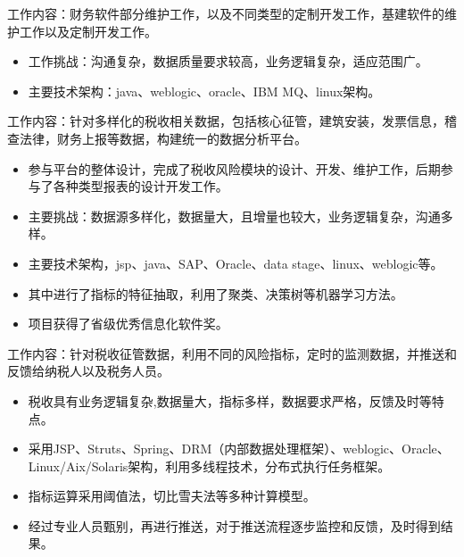 \documentclass{resume}
\begin{document}
\begin{onehalfspacing}
工作内容：财务软件部分维护工作，以及不同类型的定制开发工作，基建软件的维护工作以及定制开发工作。
\begin{itemize}
  \item 工作挑战：沟通复杂，数据质量要求较高，业务逻辑复杂，适应范围广。
  \item 主要技术架构：java、weblogic、oracle、IBM MQ、linux架构。
\end{itemize}
\end{onehalfspacing}

\begin{onehalfspacing}
工作内容：针对多样化的税收相关数据，包括核心征管，建筑安装，发票信息，稽查法律，财务上报等数据，构建统一的数据分析平台。
\begin{itemize}
  \item 参与平台的整体设计，完成了税收风险模块的设计、开发、维护工作，后期参与了各种类型报表的设计开发工作。
  \item 主要挑战：数据源多样化，数据量大，且增量也较大，业务逻辑复杂，沟通多样。
  \item 主要技术架构，jsp、java、SAP、Oracle、data stage、linux、weblogic等。
  \item 其中进行了指标的特征抽取，利用了聚类、决策树等机器学习方法。
  \item 项目获得了省级优秀信息化软件奖。
\end{itemize}
\end{onehalfspacing}


\begin{onehalfspacing}
工作内容：针对税收征管数据，利用不同的风险指标，定时的监测数据，并推送和反馈给纳税人以及税务人员。
\begin{itemize}
  \item 税收具有业务逻辑复杂,数据量大，指标多样，数据要求严格，反馈及时等特点。
  \item 采用JSP、Struts、Spring、DRM（内部数据处理框架）、weblogic、Oracle、Linux/Aix/Solaris架构，利用多线程技术，分布式执行任务框架。
  \item 指标运算采用阈值法，切比雪夫法等多种计算模型。
  \item 经过专业人员甄别，再进行推送，对于推送流程逐步监控和反馈，及时得到结果。
\end{itemize}
\end{onehalfspacing}
\end{document}
